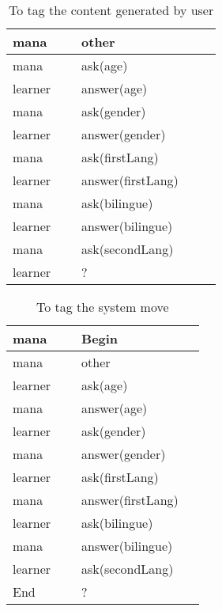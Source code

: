 \documentclass[a4paper]{article}
\begin{document}
\begin{table}
    \begin{tabular}{|l|l|}
        \hline
        mana    & other              \\ \hline
        mana    & ask(age)           \\ \hline
        learner & answer(age)        \\ \hline
        mana    & ask(gender)        \\ \hline
        learner & answer(gender)     \\ \hline
        mana    & ask(firstLang)     \\ \hline
        learner & answer(firstLang)  \\ \hline
        mana    & ask(bilingue)      \\ \hline
        learner & answer(bilingue)   \\ \hline
        mana    & ask(secondLang)    \\ \hline
        learner & ?                  \\ \hline
    \end{tabular}
    \caption{To tag the content generated by user}
    \label{table:user_align}
\end{table}

\begin{table}
    \begin{tabular}{|l|l|}
        \hline
        mana    & Begin \\ \hline
        mana    & other              \\ \hline
        learner & ask(age)           \\ \hline
        mana    & answer(age)        \\ \hline
        learner & ask(gender)        \\ \hline
        mana    & answer(gender)     \\ \hline
        learner & ask(firstLang)     \\ \hline
        mana    & answer(firstLang)  \\ \hline
        learner & ask(bilingue)      \\ \hline
        mana    & answer(bilingue)   \\ \hline
        learner & ask(secondLang)    \\ \hline
        End     & ?                  \\ \hline
    \end{tabular}
    \caption{To tag the system move}
    \label{table:system_align}
\end{table}
\end{document}
